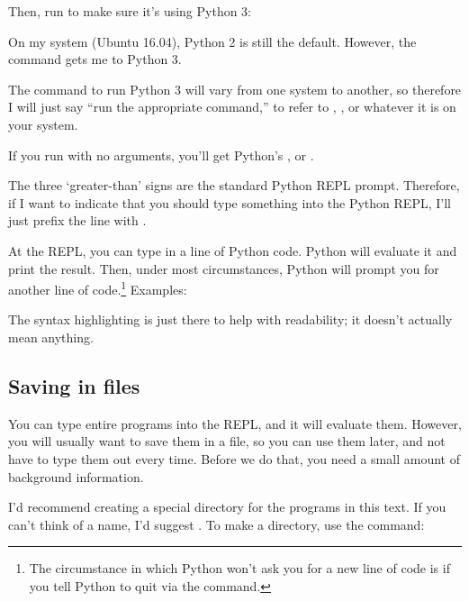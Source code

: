 
Then, run  to make sure it's using Python 3:


On my system (Ubuntu 16.04), Python 2 is still the default. However,
the command  gets me to Python 3.


The command to run Python 3 will vary from one system to another, so
therefore I will just say ``run the appropriate 
command,'' to refer to , , or whatever it
is on your system.

If you run  with no arguments, you'll get Python's
, or .


\begin{remark}
  The three `greater-than' signs are the standard Python REPL
  prompt. Therefore, if I want to indicate that you should type
  something into the Python REPL, I'll just prefix the line with
  \code{>>>}.
\end{remark}

At the REPL, you can type in a line of Python code. Python will
evaluate it and print the result. Then, under most circumstances,
Python will prompt you for another line of code.\footnote{The
  circumstance in which Python won't ask you for a new line of code is
  if you tell Python to quit via the  command.} Examples:


\begin{remark}
  The syntax highlighting is just there to help with readability; it
  doesn't actually mean anything.
\end{remark}

\subsection{Saving in files}

You can type entire programs into the REPL, and it will evaluate
them. However, you will usually want to save them in a file, so you
can use them later, and not have to type them out every time. Before
we do that, you need a small amount of background information.

I'd recommend creating a special directory for the programs in this
text. If you can't think of a name, I'd suggest . To make a
directory, use the  command:

